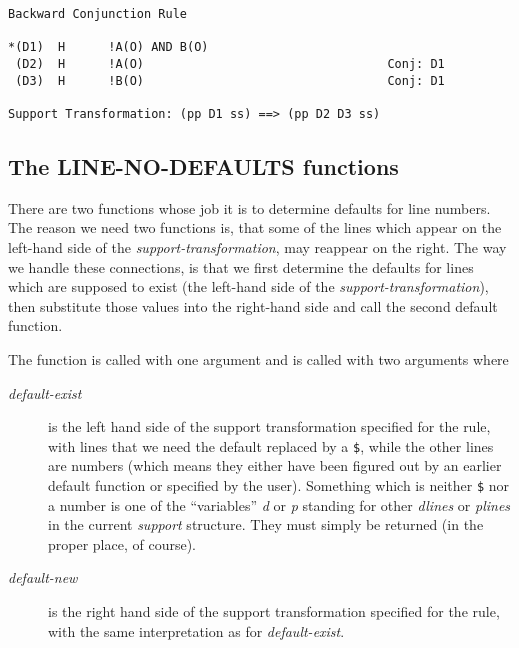 \begin{verbatim}
Backward Conjunction Rule

*(D1)  H      !A(O) AND B(O)                                          
 (D2)  H      !A(O)                                  Conj: D1
 (D3)  H      !B(O)                                  Conj: D1

Support Transformation: (pp D1 ss) ==> (pp D2 D3 ss) 
\end{verbatim}


\subsection{The LINE-NO-DEFAULTS functions}

There are two functions whose job it is to determine defaults for line
numbers.  The reason we need two functions is, that some of the lines
which appear on the left-hand side of the {\it support-transformation},
may reappear on the right.  The way we handle these connections, is
that we first determine the defaults for lines which are supposed
to exist (the left-hand side of the {\it support-transformation}), then
substitute those values into the right-hand side and call the second
default function.

The function  is called with one argument
{} and 
is called with two arguments
{}
where

\begin{description}
\item [{\it default-exist} ]  is the left hand side of the support transformation
specified for the rule, with lines that we need the default replaced
by a {\tt \$}, while the other lines are numbers (which means they either have
been figured out by an earlier default function or specified by the user).
Something which is neither {\tt \$} nor a number is one of the ``variables''
{\it d} or {\it p} standing for other {\it dlines} or {\it plines} in the current
{\it support} structure.  They must simply be returned (in the proper place,
of course).

\item [{\it default-new} ]  is the right hand side of the support transformation
specified for the rule, with the same interpretation as for {\it default-exist}.
\end{description}

